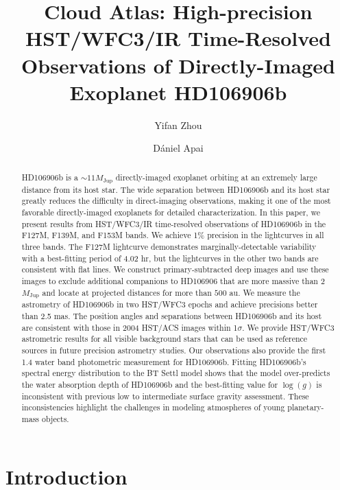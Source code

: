 \documentclass[twocolumn]{aastex62}
\newcommand{\mjup}{\ensuremath{M_\mathrm{Jup}}\xspace}
\newcommand{\logg}{\ensuremath{\log(g)}\xspace}
\begin{document}
\title{Cloud Atlas: High-precision HST/WFC3/IR Time-Resolved Observations of Directly-Imaged Exoplanet HD106906b}


\author{Yifan Zhou}

\author{D\'aniel Apai}

\begin{abstract}
  HD106906b is a $\sim11\mjup$ directly-imaged exoplanet orbiting at an extremely large distance from its host star. The wide separation between HD106906b and its host star greatly reduces the difficulty in direct-imaging observations, making it one of the most favorable directly-imaged exoplanets for detailed characterization. In this paper, we present results from HST/WFC3/IR time-resolved observations of HD106906b in the F127M, F139M, and F153M bands. We achieve 1\% precision in the lightcurves in all three bands. The F127M lightcurve demonstrates marginally-detectable variability with a best-fitting period of 4.02 hr, but the lightcurves in the other two bands are consistent with flat lines. We construct primary-subtracted deep images and use these images to  exclude additional companions to HD106906 that are more massive than 2\mjup{} and locate at projected distances for more than $500$ au. We measure the astrometry of HD106906b in two HST/WFC3 epochs and achieve precisions better than 2.5 mas. The position angles and separations between HD106906b and its host are consistent  with those in 2004 HST/ACS images within 1$\sigma$. We provide HST/WFC3 astrometric results for all visible background stars that can be used as reference sources in future precision astrometry studies. Our observations also provide the first 1.4 \micron{} water band photometric measurement for HD106906b. Fitting HD106906b's spectral energy distribution to the BT Settl model shows that the model over-predicts the water absorption depth of HD106906b and the best-fitting value for \logg{} is inconsistent with previous low to intermediate surface gravity assessment. These inconsistencies highlight the challenges in modeling atmospheres of young planetary-mass objects.
\end{abstract}


\section{Introduction}
\end{document}
